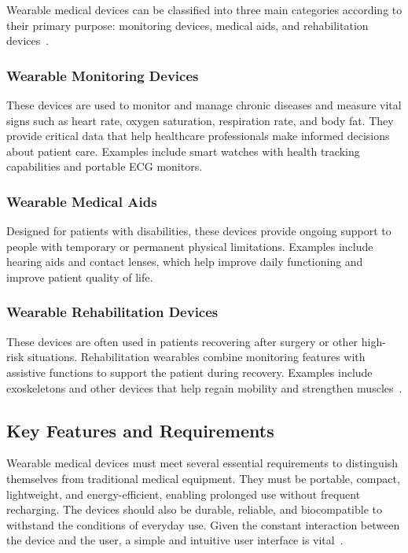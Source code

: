 \documentclass[journal]{IEEEtran}
\begin{document}
    Wearable medical devices can be classified into three main categories according to their primary purpose: monitoring devices, medical aids, and rehabilitation devices~\cite{Fotiadis2006}.
    
        \subsubsection{Wearable Monitoring Devices}
        These devices are used to monitor and manage chronic diseases and measure vital signs such as heart rate, oxygen saturation, respiration rate, and body fat. They provide critical data that help healthcare professionals make informed decisions about patient care. Examples include smart watches with health tracking capabilities and portable ECG monitors.

        \subsubsection{Wearable Medical Aids}
        Designed for patients with disabilities, these devices provide ongoing support to people with temporary or permanent physical limitations. Examples include hearing aids and contact lenses, which help improve daily functioning and improve patient quality of life.

        \subsubsection{Wearable Rehabilitation Devices}
        These devices are often used in patients recovering after surgery or other high-risk situations. Rehabilitation wearables combine monitoring features with assistive functions to support the patient during recovery. Examples include exoskeletons and other devices that help regain mobility and strengthen muscles~\cite{Hemapriya2017}.

    \subsection{Key Features and Requirements}
    Wearable medical devices must meet several essential requirements to distinguish themselves from traditional medical equipment. They must be portable, compact, lightweight, and energy-efficient, enabling prolonged use without frequent recharging. The devices should also be durable, reliable, and biocompatible to withstand the conditions of everyday use. Given the constant interaction between the device and the user, a simple and intuitive user interface is vital~\cite{Lu2020}.
\end{document}
